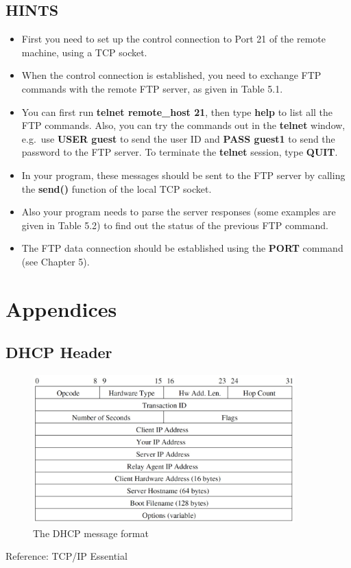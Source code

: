 \documentclass[10pt,a4paper]{article}
\numberwithin{equation}{section}
\numberwithin{figure}{section}
\numberwithin{table}{section}
\begin{document}
    \subsection*{HINTS}
    \begin{itemize}
        \item First you need to set up the control connection to Port 21 of the remote machine, using a TCP socket.
        \item When the control connection is established, you need to exchange FTP commands with the remote FTP server, as given in Table 5.1.
        \item You can first run \textbf{telnet remote\_host 21}, then type \textbf{help} to list all the FTP commands.
        Also, you can try the commands out in the \textbf{telnet} window, e.g.\  use \textbf{USER guest} to send the user ID and \textbf{PASS guest1} to send the password to the FTP server.
        To terminate the \textbf{telnet} session, type \textbf{QUIT}.
        \item In your program, these messages should be sent to the FTP server by calling the \textbf{send()} function of the local TCP socket.
        \item Also your program needs to parse the server responses (some examples are given in Table 5.2) to find out the status of the previous FTP command.
        \item The FTP data connection should be established using the \textbf{PORT} command (see Chapter 5).
    \end{itemize}
\fi


\appendix
\section*{Appendices}
\renewcommand{\thesubsection}{\Alph{subsection}}

\subsection{DHCP Header}
\begin{figure}[H]
    \centering
    \includegraphics[width=0.9\textwidth]{img/dhcp-header.png}
    \caption{The DHCP message format}
\end{figure}
Reference: TCP/IP Essential
\end{document}
